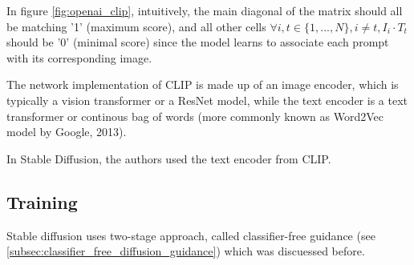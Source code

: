 In figure \ref{fig:openai_clip}, intuitively, the main diagonal of the matrix should all be matching '1' (maximum score), and all other cells $\forall i,t \in \{1, ..., N\}, i \neq t, I_i \cdot T_t$ should be '0' (minimal score) since the model learns to associate each prompt with its corresponding image.

The network implementation of CLIP is made up of an image encoder, which is typically a vision transformer \cite{vision_transformer} or a ResNet \cite{resnet} model, while the text encoder is a text transformer \cite{transformer} or continous bag of words \cite{cbow_word2vec} (more commonly known as Word2Vec model by Google, 2013).

In Stable Diffusion, the authors used the text encoder from CLIP. %












\subsection{Training}

Stable diffusion uses two-stage approach, called classifier-free guidance (see \ref{subsec:classifier_free_diffusion_guidance}) which was discuessed before. 
